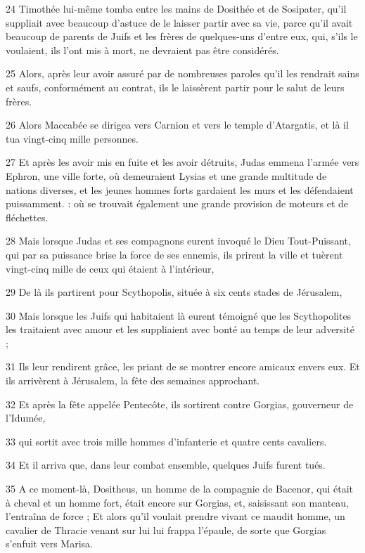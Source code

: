 \par 24 Timothée lui-même tomba entre les mains de Dosithée et de Sosipater, qu'il suppliait avec beaucoup d'astuce de le laisser partir avec sa vie, parce qu'il avait beaucoup de parents de Juifs et les frères de quelques-uns d'entre eux, qui, s'ils le voulaient, ils l'ont mis à mort, ne devraient pas être considérés.
\par 25 Alors, après leur avoir assuré par de nombreuses paroles qu'il les rendrait sains et saufs, conformément au contrat, ils le laissèrent partir pour le salut de leurs frères.
\par 26 Alors Maccabée se dirigea vers Carnion et vers le temple d'Atargatis, et là il tua vingt-cinq mille personnes.
\par 27 Et après les avoir mis en fuite et les avoir détruits, Judas emmena l'armée vers Ephron, une ville forte, où demeuraient Lysias et une grande multitude de nations diverses, et les jeunes hommes forts gardaient les murs et les défendaient puissamment. : où se trouvait également une grande provision de moteurs et de fléchettes.
\par 28 Mais lorsque Judas et ses compagnons eurent invoqué le Dieu Tout-Puissant, qui par sa puissance brise la force de ses ennemis, ils prirent la ville et tuèrent vingt-cinq mille de ceux qui étaient à l'intérieur,
\par 29 De là ils partirent pour Scythopolis, située à six cents stades de Jérusalem,
\par 30 Mais lorsque les Juifs qui habitaient là eurent témoigné que les Scythopolites les traitaient avec amour et les suppliaient avec bonté au temps de leur adversité ;
\par 31 Ils leur rendirent grâce, les priant de se montrer encore amicaux envers eux. Et ils arrivèrent à Jérusalem, la fête des semaines approchant.
\par 32 Et après la fête appelée Pentecôte, ils sortirent contre Gorgias, gouverneur de l'Idumée,
\par 33 qui sortit avec trois mille hommes d'infanterie et quatre cents cavaliers.
\par 34 Et il arriva que, dans leur combat ensemble, quelques Juifs furent tués.
\par 35 A ce moment-là, Dositheus, un homme de la compagnie de Bacenor, qui était à cheval et un homme fort, était encore sur Gorgias, et, saisissant son manteau, l'entraîna de force ; Et alors qu'il voulait prendre vivant ce maudit homme, un cavalier de Thracie venant sur lui lui frappa l'épaule, de sorte que Gorgias s'enfuit vers Marisa.
